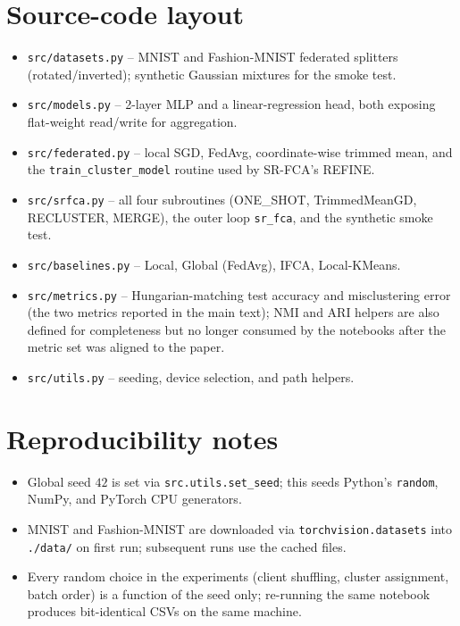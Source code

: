 \section*{Source-code layout}

\begin{itemize}
    \item \texttt{src/datasets.py} -- MNIST and Fashion-MNIST federated splitters (rotated/inverted); synthetic Gaussian mixtures for the smoke test.
    \item \texttt{src/models.py} -- 2-layer MLP and a linear-regression head, both exposing flat-weight read/write for aggregation.
    \item \texttt{src/federated.py} -- local SGD, FedAvg, coordinate-wise trimmed mean, and the \texttt{train\_cluster\_model} routine used by SR-FCA's REFINE.
    \item \texttt{src/srfca.py} -- all four subroutines (ONE\_SHOT, TrimmedMeanGD, RECLUSTER, MERGE), the outer loop \texttt{sr\_fca}, and the synthetic smoke test.
    \item \texttt{src/baselines.py} -- Local, Global (FedAvg), IFCA, Local-KMeans.
    \item \texttt{src/metrics.py} -- Hungarian-matching test accuracy and misclustering error (the two metrics reported in the main text); NMI and ARI helpers are also defined for completeness but no longer consumed by the notebooks after the metric set was aligned to the paper.
    \item \texttt{src/utils.py} -- seeding, device selection, and path helpers.
\end{itemize}

\section*{Reproducibility notes}

\begin{itemize}
    \item Global seed $42$ is set via \texttt{src.utils.set\_seed}; this seeds Python's \texttt{random}, NumPy, and PyTorch CPU generators.
    \item MNIST and Fashion-MNIST are downloaded via \texttt{torchvision.datasets} into \texttt{./data/} on first run; subsequent runs use the cached files.
    \item Every random choice in the experiments (client shuffling, cluster assignment, batch order) is a function of the seed only; re-running the same notebook produces bit-identical CSVs on the same machine.
\end{itemize}
